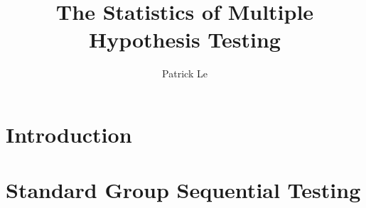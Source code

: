 \documentclass[final,3p,times]{elsarticle}
\begin{document}
\begin{frontmatter}



\title{The Statistics of Multiple Hypothesis Testing}


\author{Patrick Le}

\address{}

\begin{abstract}

\end{abstract}

\begin{keyword}


\end{keyword}

\end{frontmatter}



\section{Introduction}


\section{Standard Group Sequential Testing}
\end{document}
